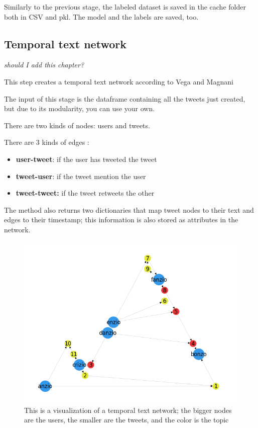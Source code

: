 Similarly to the previous stage, the labeled dataset is saved in the cache folder both in CSV and pkl. The model and the labels are saved, too.

\subsection{Temporal text network}
\textit{should I add this chapter?}

This step creates a temporal text network according to Vega and Magnani \cite{vega_foundations_2018} 

The input of this stage is the dataframe containing all the tweets just created, but due to its modularity, you can use your own.

There are two kinds of nodes: users and tweets.

There are 3 kinds of edges : 
\begin{itemize}
    \item \textbf{user-tweet}: if the user has tweeted the tweet
    \item  \textbf{tweet-user}: if the tweet mention the user
    \item \textbf{tweet-tweet:} if the tweet retweets the other
\end{itemize}


The method also returns two dictionaries that map tweet nodes to their text and edges to their timestamp; this information is also stored as attributes in the network.
\begin{figure}
    \centering
    \includegraphics[width=0.75\linewidth]{Chapter4/figures/full_network.png}
    \caption{This is a visualization of a temporal text network; the bigger nodes are the users, the smaller are the tweets, and the color is the topic}
    \label{fig:tt_network}
\end{figure}

